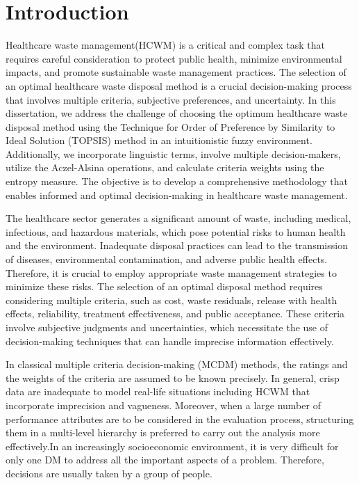 \chapter{Introduction}

 
  \label{sec:start}
 
Healthcare waste management(HCWM) is a critical and complex task that requires careful consideration to protect public health, minimize environmental impacts, and promote sustainable waste management practices. The selection of an optimal healthcare waste disposal method is a crucial decision-making process that involves multiple criteria, subjective preferences, and uncertainty. In this dissertation, we address the challenge of choosing the optimum healthcare waste disposal method using the Technique for Order of Preference by Similarity to Ideal Solution (TOPSIS) method in an intuitionistic fuzzy environment. Additionally, we incorporate linguistic terms, involve multiple decision-makers, utilize the Aczel-Alsina operations, and calculate criteria weights using the entropy measure. The objective is to develop a comprehensive methodology that enables informed and optimal decision-making in healthcare waste management.

\vspace{5mm}

The healthcare sector generates a significant amount of waste, including medical, infectious, and hazardous materials, which pose potential risks to human health and the environment. Inadequate disposal practices can lead to the transmission of diseases, environmental contamination, and adverse public health effects. Therefore, it is crucial to employ appropriate waste management strategies to minimize these risks. The selection of an optimal disposal method requires considering multiple criteria, such as cost, waste residuals, release with health effects, reliability, treatment effectiveness, and public acceptance. These criteria involve subjective judgments and uncertainties, which necessitate the use of decision-making techniques that can handle imprecise information effectively.

\vspace{5mm}

In classical multiple criteria decision-making (MCDM) methods, the ratings and the weights of the
criteria are assumed to be known precisely. In general, crisp data
are inadequate to model real-life situations including HCWM that
incorporate imprecision and vagueness. Moreover, when a large
number of performance attributes are to be considered in the
evaluation process, structuring them in a multi-level hierarchy is
preferred to carry out the analysis more effectively.In an increasingly socioeconomic environment, it is very
difficult for only one DM to address all the important
aspects of a problem. Therefore, decisions are usually
taken by a group of people.

